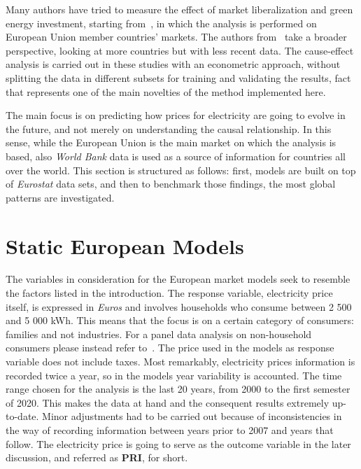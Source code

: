 \documentclass[a4paper,12pt]{book}
\begin{document}
Many authors have tried to measure the effect of market liberalization and green energy investment, starting from~\cite{moreno2012electricity}, in which the analysis  is performed on European Union member countries' markets. The authors from~\cite{nagayama2009electric} take a broader perspective, looking at more countries but with less recent data. The cause-effect analysis is carried out in these studies with an econometric approach, without splitting the data in different subsets for training and validating the results, fact that represents one of the main novelties of the method implemented here.

The main focus is on predicting how prices for electricity are going to evolve in the future, and not merely on understanding the causal relationship. In this sense, while the European Union is the main market on which the analysis is based, also \textit{World Bank} data is used as a source of information for countries all over the world. This section is structured as follows: first, models are built on top of \textit{Eurostat} data sets, and then to benchmark those findings, the most global patterns are investigated.

\section{Static European Models}

The variables in consideration for the European market models seek to resemble the factors listed in the introduction. The response variable, electricity price itself, is expressed in \textit{Euros} and involves households who consume between 2 500 and 5 000 kWh. This means that the focus is on a certain category of consumers: families and not industries. For a panel data analysis on non-household consumers please instead refer to~\cite{del2019industrial}.  The price used in the models as response variable does not include taxes. Most remarkably, electricity prices information is recorded twice a year, so in the models year variability is accounted. The time range chosen for the analysis is the last 20 years, from 2000 to the first semester of 2020. This makes the data at hand and the consequent results extremely up-to-date. Minor adjustments had to be carried out because of inconsistencies in the way of recording information between years prior to 2007 and years that follow. The electricity price is going to serve as the outcome variable in the later discussion, and referred as \textbf{PRI}, for short.
\end{document}

